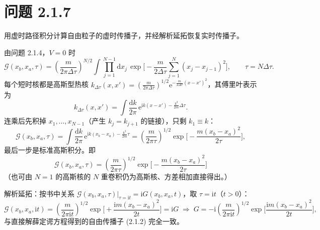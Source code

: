 \section*{问题 2.1.7}
\begin{problem}
用虚时路径积分计算自由粒子的虚时传播子，并经解析延拓恢复实时传播子。
\end{problem}
\solution
由问题 2.1.4，$V=0$ 时
\begin{equation*}
\mathcal G(x_b,x_a,\tau)=\left(\frac{m}{2\pi\Delta\tau}\right)^{N/2}
\int\prod_{j=1}^{N-1}\mathrm{d}x_j\,
\exp\Big[-\frac m{2\Delta\tau}\sum_{j=1}^{N}(x_j-x_{j-1})^2\Big],
\qquad \tau=N\Delta\tau .
\end{equation*}
每个短时核都是高斯型热核 $k_{\Delta\tau}(x,x')=(\frac m{2\pi\Delta\tau})^{1/2}\mathrm{e}^{-\frac m{2\Delta\tau}(x-x')^2}$，其傅里叶表示为
\begin{equation*}
k_{\Delta\tau}(x,x')=\int\frac{\mathrm{d}k}{2\pi}\,
\mathrm{e}^{\mathrm{i}k(x-x')-\frac{k^2}{2m}\Delta\tau}.
\end{equation*}
连乘后先积掉 $x_1,\dots,x_{N-1}$（产生 $k_j=k_{j+1}$ 的链接），只剩 $k_1\equiv k$：
\begin{equation*}
\mathcal G(x_b,x_a,\tau)=\int\frac{\mathrm{d}k}{2\pi}\,
\mathrm{e}^{\mathrm{i}k(x_b-x_a)-\frac{k^2}{2m}\tau}
=\left(\frac{m}{2\pi\tau}\right)^{1/2}\exp\Big[-\frac{m(x_b-x_a)^2}{2\tau}\Big],
\end{equation*}
最后一步是标准高斯积分。即
\begin{equation*}
\boxed{\;\mathcal G(x_b,x_a,\tau)=\left(\frac{m}{2\pi\tau}\right)^{1/2}
\exp\Big[-\frac{m(x_b-x_a)^2}{2\tau}\Big]\;}
\end{equation*}
（也可由 $N=1$ 的高斯核的 $N$ 重卷积仍为高斯核、方差相加直接得出。）

解析延拓：按书中关系 $\mathcal G(x_b,x_a,\tau)\big|_{\tau=\mathrm{i}t}=\mathrm{i}G(x_b,x_a,t)$，取 $\tau=\mathrm{i}t$（$t>0$）：
\begin{equation*}
\mathcal G(x_b,x_a,\mathrm{i}t)=\left(\frac{m}{2\pi\mathrm{i}t}\right)^{1/2}
\exp\Big[+\frac{\mathrm{i}m(x_b-x_a)^2}{2t}\Big]=\mathrm{i}G
\;\Longrightarrow\;
G=-\mathrm{i}\left(\frac{m}{2\pi\mathrm{i}t}\right)^{1/2}\exp\Big[\frac{\mathrm{i}m(x_b-x_a)^2}{2t}\Big],
\end{equation*}
与直接解薛定谔方程得到的自由传播子 (2.1.2) 完全一致。

